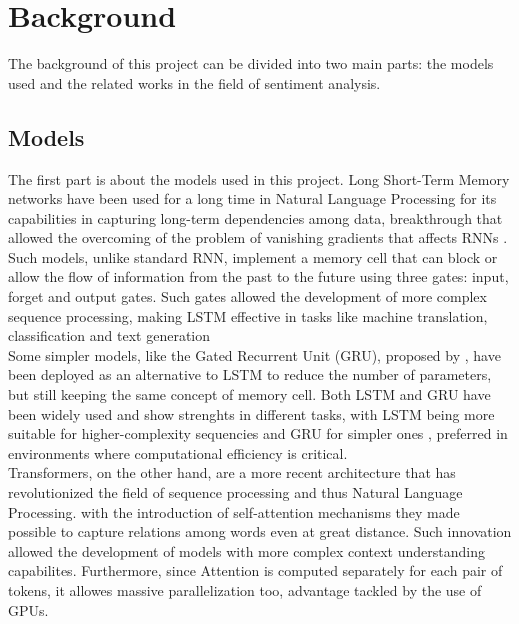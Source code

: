\section{Background}
\label{sec:background}
    The background of this project can be divided into two main parts:
    the models used and the related works in the field of sentiment analysis. 

    \subsection{Models}
    \label{sec:models}
        The first part is about the models used in this project. Long Short-Term Memory networks have been used for
        a long time in Natural Language Processing for its capabilities in capturing long-term
        dependencies among data, breakthrough that allowed the overcoming of the problem of vanishing gradients that affects RNNs
        \citep{hochreiter1997long}. Such models, unlike standard RNN, implement a memory cell that can block or allow
        the flow of information from the past to the future using three gates:
        input, forget and output gates. Such gates allowed the development of more
        complex sequence processing, making LSTM effective in tasks like 
        machine translation, classification and text generation \\
        
        Some simpler models, like the Gated Recurrent Unit (GRU), proposed by \citet{cho2014learning},
        have been deployed as an alternative to LSTM to reduce the number of parameters, but still keeping the
        same concept of memory cell. Both LSTM and GRU have been widely used and
        show strenghts in different tasks, with LSTM being more suitable for
        higher-complexity sequencies and GRU for simpler ones \citep{Cahuantzi_2023}, 
        preferred in environments where computational efficiency is critical. \\

        Transformers, on the other hand, are a more recent architecture \citep{vaswani2023attentionneed}
        that has revolutionized the field of sequence processing and thus Natural
        Language Processing. with the introduction of self-attention mechanisms they made 
        possible to capture relations among words even at great distance. Such innovation allowed
        the development of models with more complex context understanding capabilites.
        Furthermore, since Attention is computed separately for each pair of tokens, it 
        allowes massive parallelization too, advantage tackled by the use of GPUs. \\

